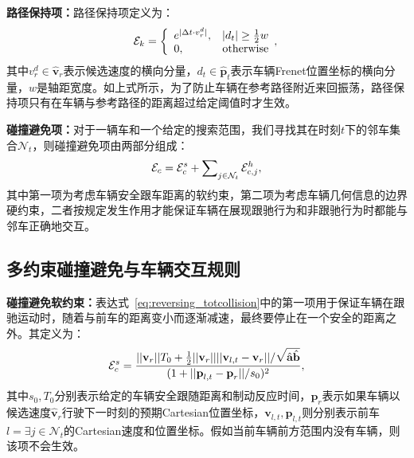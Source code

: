 \textbf{路径保持项：}路径保持项定义为：
\begin{equation}
\setlength\abovedisplayskip{10pt}
\setlength\belowdisplayskip{10pt}
\label{eq:reversing_pathkeep}
    \mathcal{E}_{k} = 
    \left\{
        \begin{array}{lr}
        e^{|\Delta{t} \cdot v^{d}_{r}|}, & | d_{t}| \geq \frac{1}{2}w \\
        0, & \rm{otherwise}
        \end{array}, 
    \right.
\end{equation}
其中$v^{d}_{r} \in \hat{\textbf{v}}_{r}$表示候选速度的横向分量，$d_{t} \in \hat{\textbf{p}}_t$表示车辆Frenet位置坐标的横向分量，$w$是轴距宽度。如上式所示，为了防止车辆在参考路径附近来回振荡，路径保持项只有在车辆与参考路径的距离超过给定阈值时才生效。

\textbf{碰撞避免项：}对于一辆车和一个给定的搜索范围，我们寻找其在时刻$t$下的邻车集合$\mathcal{N}_t$，则碰撞避免项由两部分组成：
\begin{equation}
\setlength\abovedisplayskip{10pt}
\setlength\belowdisplayskip{10pt}
\label{eq:reversing_totcollision}
    \mathcal{E}_{c} = \mathcal{E}^{s}_{c} + \sum\nolimits_{j \in \mathcal{N}_{t}} \mathcal{E}^{h}_{c, j},
\end{equation}
其中第一项为考虑车辆安全跟车距离的软约束，第二项为考虑车辆几何信息的边界硬约束，二者按规定发生作用才能保证车辆在展现跟驰行为和非跟驰行为时都能与邻车正确地交互。


\subsection{多约束碰撞避免与车辆交互规则}
\label{section:reversing_collisionavoid}

\textbf{碰撞避免软约束：}表达式~\ref{eq:reversing_totcollision}中的第一项用于保证车辆在跟驰运动时，随着与前车的距离变小而逐渐减速，最终要停止在一个安全的距离之外。其定义为：
\begin{equation}
\setlength\abovedisplayskip{10pt}
\setlength\belowdisplayskip{10pt}
\label{eq:reversing_softcollision}
    \mathcal{E}^{s}_{c} = 
    \dfrac{
    ||\textbf{v}_{r}||T_{0} + %
    \tfrac{1}{2} ||\textbf{v}_{r}|| ||\textbf{v}_{l,t}-\textbf{v}_{r}|| / \sqrt{\hat{\textbf{a}} \hat{\textbf{b}}}
    }{
    (1+ || \textbf{p}_{l,t} - \textbf{p}_{r} || / s_{0} )^2
    },
\end{equation}
其中$s_{0}, T_{0}$分别表示给定的车辆安全跟随距离和制动反应时间，$\textbf{p}_{r}$表示如果车辆以候选速度$\hat{\textbf{v}}_{r}$行驶下一时刻的预期Cartesian位置坐标，$\textbf{v}_{l,t}, \textbf{p}_{l,t}$则分别表示前车$l = \exists j \in \mathcal{N}_{t}$的Cartesian速度和位置坐标。假如当前车辆前方范围内没有车辆，则该项不会生效。


